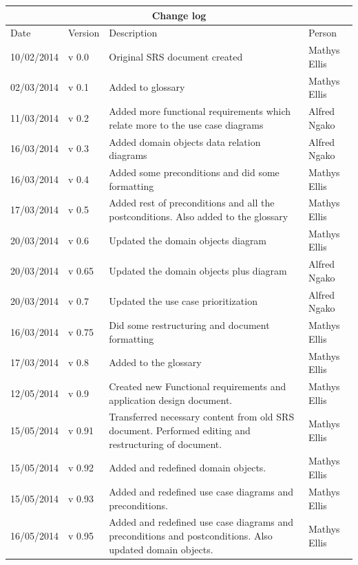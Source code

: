 \documentclass[12pt]{article}
\begin{document}
\begin{center}
\begin{tabular}{|l|p{1.4cm}|p{8cm}|p{2.8cm}|}
\hline
\multicolumn{4}{|c|}{\bf Change log} \\
\hline
 Date & Version & Description &  Person \\
\hline
10/02/2014 & v 0.0 & Original SRS document created & Mathys Ellis \\
\hline
02/03/2014 & v 0.1 & Added to glossary & Mathys Ellis \\
\hline
11/03/2014 & v 0.2 & Added more functional requirements which relate more to the use case diagrams & Alfred Ngako \\
\hline
16/03/2014 & v 0.3 & Added domain objects data relation diagrams & Alfred Ngako \\
\hline
16/03/2014 & v 0.4 & Added some preconditions and did some formatting & Mathys Ellis \\
\hline
17/03/2014 & v 0.5 & Added rest of preconditions and all the postconditions. Also added to the glossary & Mathys Ellis \\
\hline
20/03/2014 & v 0.6 & Updated the domain objects diagram  & Mathys Ellis \\
\hline
20/03/2014 & v 0.65 & Updated the domain objects plus diagram  & Alfred Ngako \\
\hline
20/03/2014 & v 0.7 & Updated the use case prioritization  & Alfred Ngako \\
\hline
16/03/2014 & v 0.75 & Did some restructuring and document formatting & Mathys Ellis \\
\hline
17/03/2014 & v 0.8 & Added to the glossary & Mathys Ellis \\
\hline
12/05/2014 & v 0.9 & Created new Functional requirements and application design document. & Mathys Ellis \\
\hline
15/05/2014 & v 0.91 & Transferred necessary content from old SRS document. Performed editing and restructuring of document. & Mathys Ellis \\
\hline
15/05/2014 & v 0.92 & Added and redefined domain objects. & Mathys Ellis \\
\hline
15/05/2014 & v 0.93 & Added and redefined use case diagrams and preconditions. & Mathys Ellis \\
\hline
16/05/2014 & v 0.95 & Added and redefined use case diagrams and preconditions and postconditions. Also updated domain objects. & Mathys Ellis \\
\hline

\end{tabular}
\end{center}
\newpage
\tableofcontents
\end{document}
